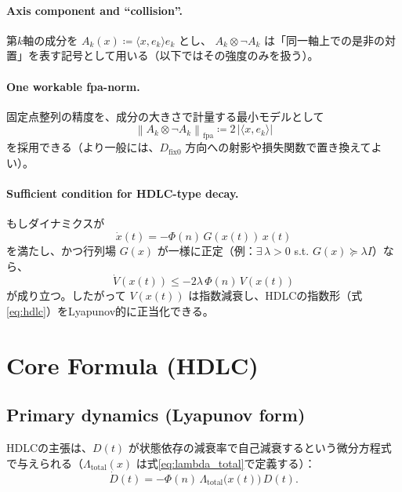 \documentclass[12pt,a4paper]{article}
\newcommand{\dfix}{D_{\text{fix0}}}
\begin{document}
\paragraph{Axis component and ``collision''.}
第$k$軸の成分を $A_k(x)\coloneqq \langle x,e_k\rangle e_k$ とし、
$A_k\otimes \neg A_k$ は「同一軸上での是非の対置」を表す記号として用いる（以下ではその強度のみを扱う）。

\paragraph{One workable fpa-norm.}
固定点整列の精度を、成分の大きさで計量する最小モデルとして
\begin{equation}
  \left\lVert A_k \otimes \neg A_k \right\rVert_{\mathrm{fpa}} \coloneqq 2\,\bigl\lvert \langle x,e_k\rangle \bigr\rvert
  \label{eq:fpa_example}
\end{equation}
を採用できる（より一般には、$\dfix$ 方向への射影や損失関数で置き換えてよい）。

\paragraph{Sufficient condition for HDLC-type decay.}
もしダイナミクスが
\begin{equation}
  \dot x(t) = -\Phi(n)\,G(x(t))\,x(t)
  \label{eq:dyn_assumption}
\end{equation}
を満たし、かつ行列場 $G(x)$ が一様に正定（例：$\exists\,\lambda>0$ s.t. $G(x)\succeq \lambda I$）なら、
\begin{equation}
  \dot V(x(t)) \le -2\lambda\,\Phi(n)\,V(x(t))
\end{equation}
が成り立つ。したがって $V(x(t))$ は指数減衰し、HDLCの指数形（式\eqref{eq:hdlc}）をLyapunov的に正当化できる。

\section{Core Formula (HDLC)}
\subsection{Primary dynamics (Lyapunov form)}
HDLCの主張は、$D(t)$ が状態依存の減衰率で自己減衰するという微分方程式で与えられる（$\Lambda_{\mathrm{total}}(x)$ は式\eqref{eq:lambda_total}で定義する）：
\begin{equation}
  \dot D(t) = -\Phi(n)\,\Lambda_{\mathrm{total}}\bigl(x(t)\bigr)\,D(t).
  \label{eq:hdlc_ode}
\end{equation}
\end{document}
